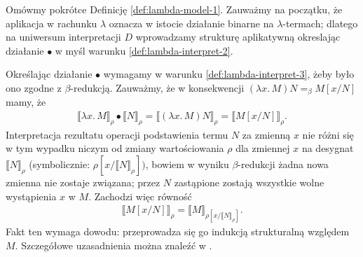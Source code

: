 \begin{definicja}


\end{definicja}

Omówmy pokrótce Definicję \ref{def:lambda-model-1}. Zauważmy na początku, że aplikacja w rachunku \(\lambda\) oznacza w istocie działanie binarne na \(\lambda\)-termach; dlatego na uniwersum interpretacji \(D\) wprowadzamy strukturę aplikatywną okreslając działanie \(\bullet\) w myśl warunku \ref{def:lambda-interpret-2}. 

Określając działanie \(\bullet\) wymagamy w warunku \ref{def:lambda-interpret-3}, żeby było ono zgodne z \(\beta\)-redukcją. Zauważmy, że w konsekwencji \((\lambda x.\,M) N =_\beta M[x/N]\) mamy, że
\begin{align*}
  \llbracket \lambda x.\,M \rrbracket_\rho \bullet \llbracket N \rrbracket_\rho =
  \llbracket (\lambda x.\,M) N\rrbracket_\rho = \llbracket M[x/N] \rrbracket_\rho.  
\end{align*}
Interpretacja rezultatu operacji podstawienia termu \(N\) za zmienną \(x\) nie różni się w tym wypadku niczym od zmiany wartościowania \(\rho\) dla zmiennej \(x\) na desygnat \(\llbracket N\rrbracket_\rho\) (symbolicznie: \(\rho[x/\llbracket N \rrbracket_\rho])\), bowiem w wyniku \(\beta\)-redukcji żadna nowa zmienna nie zostaje związana; przez \(N\) zastąpione zostają wszystkie wolne wystąpienia \(x\) w \(M\). Zachodzi więc równość
\begin{align*}
  \llbracket M[x/N] \rrbracket_\rho = \llbracket M \rrbracket_{\rho[x/\llbracket N \rrbracket_\rho]}.
\end{align*}
Fakt ten wymaga dowodu: przeprowadza się go indukcją strukturalną względem \(M\). Szczegółowe uzasadnienia można znaleźć w \cite[Tw. 15.10(a)]{Hindley:2008:LCI:1388400}.

